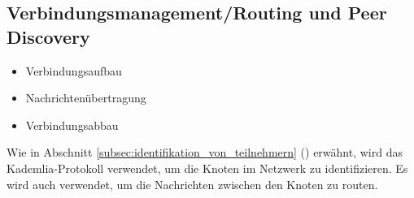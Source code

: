 \subsection{Verbindungsmanagement/Routing und Peer Discovery}
\label{subsec:routing}

\begin{itemize}
    \item Verbindungsaufbau
    \item Nachrichtenübertragung
    \item Verbindungsabbau
\end{itemize}

Wie in Abschnitt \ref{subsec:identifikation_von_teilnehmern} 
() erwähnt,
wird das Kademlia-Protokoll verwendet, um die Knoten im Netzwerk zu identifizieren.
Es wird auch verwendet, um die Nachrichten zwischen den Knoten zu routen.




